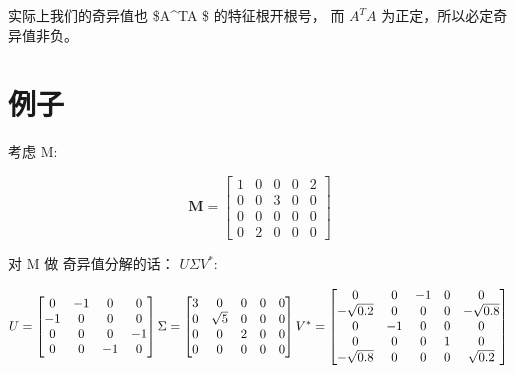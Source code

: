 \documentclass[
]{book}
\begin{document}
实际上我们的奇异值也 \$A\^{}TA \$ 的特征根开根号， 而 \(A^TA\) 为正定，所以必定奇异值非负。

\hypertarget{ux4f8bux5b50}{%
\section{例子}\label{ux4f8bux5b50}}

考虑 M:

\[\mathbf {M} ={\begin{bmatrix}1&0&0&0&2\\0&0&3&0&0\\0&0&0&0&0\\0&2&0&0&0\end{bmatrix}}\]

对 M 做 奇异值分解的话： \(UΣV^*\):

\[
U = \begin{bmatrix} 0 & -1 & 0 & 0 \\ -1 & 0 & 0 & 0 \\ 0 & 0 & 0 & -1 \\ 0 & 0 & -1 & 0\end{bmatrix} \\
\Sigma = \begin{bmatrix} 3 & 0 & 0 & 0 & 0 \\ 0 & \sqrt{5} & 0 & 0 & 0 \\ 0 & 0 & 2 & 0 & 0 \\ 0 & 0 & 0 & 0 & 0\end{bmatrix}  \\
V^* = \begin{bmatrix} 0 & 0 & -1 & 0 & 0 \\ -\sqrt{0.2} & 0 & 0 & 0 & -\sqrt{0.8} \\ 0 & -1 & 0 & 0 & 0 \\ 0 & 0 & 0 & 1 & 0  \\ -\sqrt{0.8} & 0 & 0 & 0 & \sqrt{0.2} \end{bmatrix} \\
\]
\end{document}
